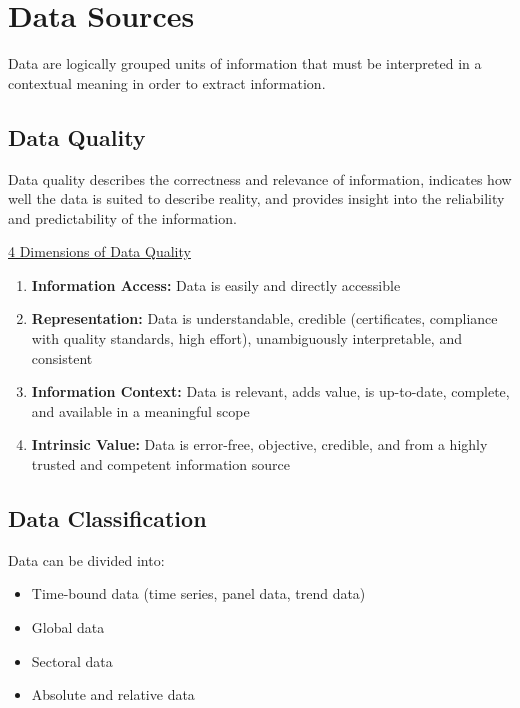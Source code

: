 %
%

\section{Data Sources}
\label{sec:dataSources}

Data are logically grouped units of information that must be interpreted in a contextual meaning in order to extract information.


\subsection{Data Quality}
\label{sec:dataQuality}

Data quality describes the correctness and relevance of information, indicates how well the data is suited to describe reality, and provides insight into the reliability and predictability of the information.

\underline{4 Dimensions of Data Quality}
    \begin{enumerate}
        \item \textbf{Information Access:} Data is easily and directly accessible   
        \item \textbf{Representation:} Data is understandable, credible (certificates, compliance with quality standards, high effort), unambiguously interpretable, and consistent
        \item \textbf{Information Context:} Data is relevant, adds value, is up-to-date, complete, and available in a meaningful scope
        \item \textbf{Intrinsic Value:} Data is error-free, objective, credible, and from a highly trusted and competent information source
    \end{enumerate}


\subsection{Data Classification}
\label{sec:dataClassification}

Data can be divided into:
\begin{itemize}
    \item Time-bound data (time series, panel data, trend data)
    \item Global data
    \item Sectoral data
    \item Absolute and relative data
\end{itemize}


